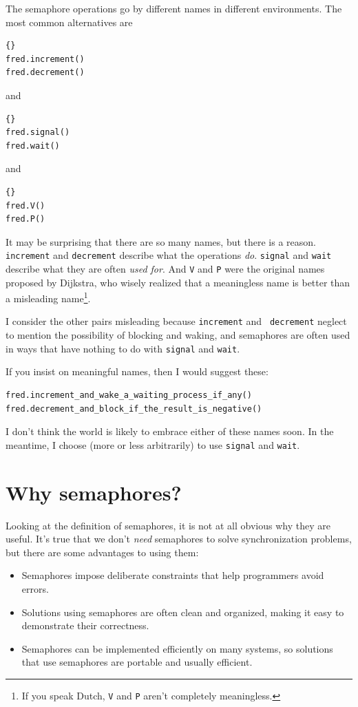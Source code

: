 \documentclass{book}
\begin{document}
The semaphore operations go by different names in different environments.
The most common alternatives are
%
\begin{lstlisting}[title={Semaphore operations}]{}
fred.increment()
fred.decrement()	
\end{lstlisting}
%
and
%
\begin{lstlisting}[title={Semaphore operations}]{}
fred.signal()
fred.wait()	
\end{lstlisting}
%
and
%
\begin{lstlisting}[title={Semaphore operations}]{}
fred.V()
fred.P()	
\end{lstlisting}
%
It may be surprising that there are so many names, but there is a
reason.  {\tt increment} and {\tt decrement}
describe what the operations {\em do}.  {\tt signal} and {\tt wait}
describe what they are often {\em used for}.  And {\tt V} and {\tt P} were
the original names proposed by Dijkstra, who wisely realized that a
meaningless name is better than a misleading name\footnote{If you speak
    Dutch, {\tt V} and {\tt P} aren't completely meaningless.}.

I consider the other pairs misleading because {\tt increment} and {\tt
        decrement} neglect to mention the possibility of blocking and waking,
and semaphores are often used in ways that have nothing to do with
    {\tt signal} and {\tt wait}.

If you insist on meaningful names, then I would suggest these:

\begin{lstlisting}[basicstyle=\tiny,title={Semaphore operations}]
fred.increment_and_wake_a_waiting_process_if_any()
fred.decrement_and_block_if_the_result_is_negative()	
\end{lstlisting}

I don't think the world is likely to embrace either of these names
soon.  In the meantime, I choose (more or less arbitrarily) to use
    {\tt signal} and {\tt wait}.


\section{Why semaphores?}

Looking at the definition of semaphores, it is not at all obvious why
they are useful.  It's true that we don't {\em need} semaphores to
solve synchronization problems, but there are some advantages to using
them:

\begin{itemize}

    \item Semaphores impose deliberate constraints that help
          programmers avoid errors.

    \item Solutions using semaphores are often clean and organized,
          making it easy to demonstrate their correctness.

    \item Semaphores can be implemented efficiently on many systems,
          so solutions that use semaphores are portable and usually
          efficient.

\end{itemize}
\end{document}
